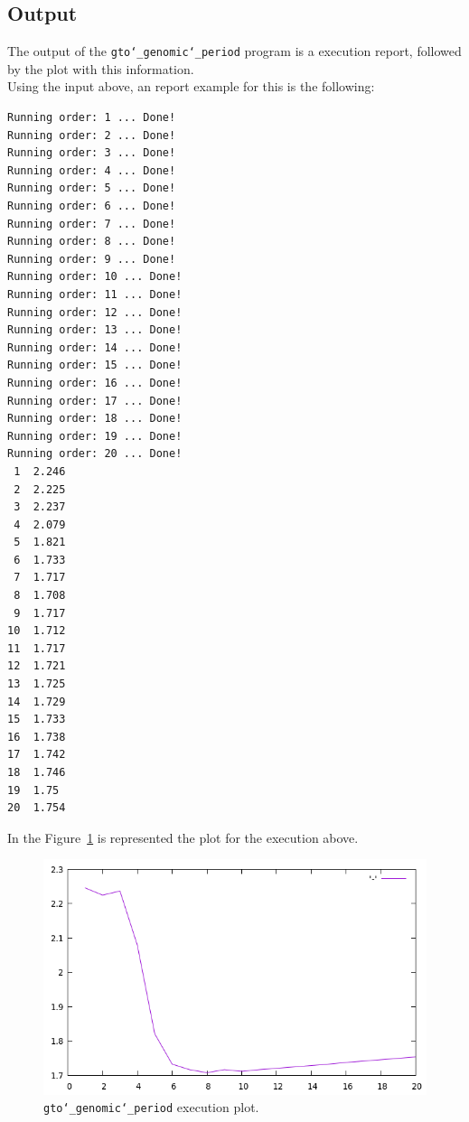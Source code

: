 \subsection*{Output}
The output of the \texttt{gto\char`_genomic\char`_period} program is a execution report, followed by the plot with this information.\\
Using the input above, an report example for this is the following:
\begin{lstlisting}
Running order: 1 ... Done!
Running order: 2 ... Done!
Running order: 3 ... Done!
Running order: 4 ... Done!
Running order: 5 ... Done!
Running order: 6 ... Done!
Running order: 7 ... Done!
Running order: 8 ... Done!
Running order: 9 ... Done!
Running order: 10 ... Done!
Running order: 11 ... Done!
Running order: 12 ... Done!
Running order: 13 ... Done!
Running order: 14 ... Done!
Running order: 15 ... Done!
Running order: 16 ... Done!
Running order: 17 ... Done!
Running order: 18 ... Done!
Running order: 19 ... Done!
Running order: 20 ... Done!
 1	2.246
 2	2.225
 3	2.237
 4	2.079
 5	1.821
 6	1.733
 7	1.717
 8	1.708
 9	1.717
10	1.712
11	1.717
12	1.721
13	1.725
14	1.729
15	1.733
16	1.738
17	1.742
18	1.746
19	1.75
20	1.754
\end{lstlisting}

In the Figure~\ref{fig:gtoGenomicPeriod} is represented the plot for the execution above.

 \begin{figure}[!h]
  \centering
  \includegraphics[scale=0.7]{./images/gto_genomic_period.png}
  \caption{\texttt{gto\char`_genomic\char`_period} execution plot.}
  \label{fig:gtoGenomicPeriod}
 \end{figure}